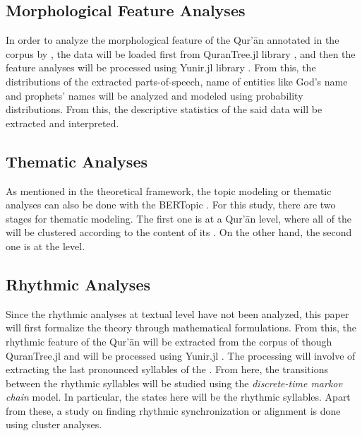 \subsection{Morphological Feature Analyses}
In order to analyze the morphological feature of the Qur'\=an annotated in the corpus by , the data will be loaded first from QuranTree.jl library , and then the feature analyses will be processed using Yunir.jl library . From this, the distributions of the extracted parts-of-speech, name of entities like God's name and prophets' names will be analyzed and modeled using probability distributions. From this, the descriptive statistics of the said data will be extracted and interpreted.
\subsection{Thematic Analyses}
As mentioned in the theoretical framework, the topic modeling or thematic analyses can also be done with the BERTopic . For this study, there are two stages for thematic modeling. The first one is at a Qur'\=an level, where all of the   will be clustered according to the content of its  . On the other hand, the second one is at the   level.
\subsection{Rhythmic Analyses}
Since the rhythmic analyses at textual level have not been analyzed, this paper will first formalize the theory through mathematical formulations. From this, the rhythmic feature of the Qur'\=an will be extracted from the corpus of  though \mbox{QuranTree.jl}  and will be processed using \mbox{Yunir.jl} . The processing will involve of extracting the last pronounced syllables of the  . From here, the transitions between the rhythmic syllables will be studied using the \textit{discrete-time markov chain} model. In particular, the states here will be the rhythmic syllables. Apart from these, a study on finding rhythmic synchronization or alignment is done using cluster analyses.
